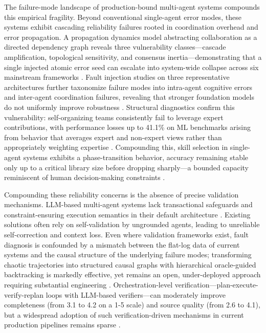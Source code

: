 \documentclass[11pt,a4paper]{article}
\begin{document}
The failure-mode landscape of production-bound multi-agent systems compounds this empirical fragility. Beyond conventional single-agent error modes, these systems exhibit cascading reliability failures rooted in coordination overhead and error propagation. A propagation dynamics model abstracting collaboration as a directed dependency graph reveals three vulnerability classes---cascade amplification, topological sensitivity, and consensus inertia---demonstrating that a single injected atomic error seed can escalate into system-wide collapse across six mainstream frameworks \cite{arxiv:2603.04474v2}. Fault injection studies on three representative architectures further taxonomize failure modes into intra-agent cognitive errors and inter-agent coordination failures, revealing that stronger foundation models do not uniformly improve robustness \cite{arxiv:2602.19843v1}. Structural diagnostics confirm this vulnerability: self-organizing teams consistently fail to leverage expert contributions, with performance losses up to 41.1\% on ML benchmarks arising from behavior that averages expert and non-expert views rather than appropriately weighting expertise \cite{arxiv:2602.01011v4}. Compounding this, skill selection in single-agent systems exhibits a phase-transition behavior, accuracy remaining stable only up to a critical library size before dropping sharply---a bounded capacity reminiscent of human decision-making constraints \cite{arxiv:2601.04748v2}.

Compounding these reliability concerns is the absence of precise validation mechanisms. LLM-based multi-agent systems lack transactional safeguards and constraint-ensuring execution semantics in their default architecture \cite{arxiv:2503.11951v3}. Existing solutions often rely on self-validation by ungrounded agents, leading to unreliable self-correction and context loss. Even where validation frameworks exist, fault diagnosis is confounded by a mismatch between the flat-log data of current systems and the causal structure of the underlying failure modes; transforming chaotic trajectories into structured causal graphs with hierarchical oracle-guided backtracking is markedly effective, yet remains an open, under-deployed approach requiring substantial engineering \cite{arxiv:2602.23701v1}. Orchestration-level verification---plan-execute-verify-replan loops with LLM-based verifiers---can moderately improve completeness (from 3.1 to 4.2 on a 1-5 scale) and source quality (from 2.6 to 4.1), but a widespread adoption of such verification-driven mechanisms in current production pipelines remains sparse \cite{arxiv:2603.11445v2}.
\end{document}
